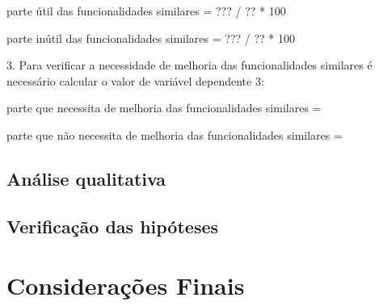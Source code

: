 parte útil das funcionalidades similares = ??? / ?? * 100%

parte inútil das funcionalidades similares  = ??? / ?? * 100%

3. Para verificar a necessidade de melhoria das funcionalidades similares é necessário calcular o valor de variável dependente 3:

parte que necessita de melhoria das funcionalidades similares = 

parte que não necessita de melhoria das funcionalidades similares =

\subsection{Análise qualitativa}


\subsection{Verificação das hipóteses}



\section{Considerações Finais}
